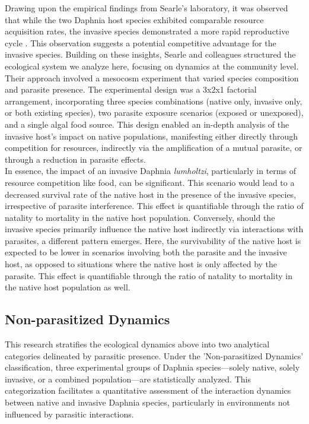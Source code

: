 \documentclass[12pt]{article}
\begin{document}
Drawing upon the empirical findings from Searle's laboratory, it was observed that while the two Daphnia host species exhibited comparable resource acquisition rates, the invasive species demonstrated a more rapid reproductive cycle \cite{Searle2016}. This observation suggests a potential competitive advantage for the invasive species. Building on these insights, Searle and colleagues structured the ecological system we analyze here, focusing on dynamics at the community level. Their approach involved a mesocosm experiment that varied species composition and parasite presence. The experimental design was a 3x2x1 factorial arrangement, incorporating three species combinations (native only, invasive only, or both existing species), two parasite exposure scenarios (exposed or unexposed), and a single algal food source. This design enabled an in-depth analysis of the invasive host's impact on native populations, manifesting either directly through competition for resources, indirectly via the amplification of a mutual parasite, or through a reduction in parasite effects.\\

In essence, the impact of an invasive Daphnia \textit{lumholtzi}, particularly in terms of resource competition like food, can be significant. This scenario would lead to a decreased survival rate of the native host in the presence of the invasive species, irrespective of parasite interference. This effect is quantifiable through the ratio of natality to mortality in the native host population. Conversely, should the invasive species primarily influence the native host indirectly via interactions with parasites, a different pattern emerges. Here, the survivability of the native host is expected to be lower in scenarios involving both the parasite and the invasive host, as opposed to situations where the native host is only affected by the parasite. This effect is quantifiable through the ratio of natality to mortality in the native host population as well.\\

\subsection{Non-parasitized Dynamics}
This research stratifies the ecological dynamics above into two analytical categories delineated by parasitic presence. Under the 'Non-parasitized Dynamics' classification, three experimental groups of Daphnia species—solely native, solely invasive, or a combined population—are statistically analyzed. This categorization facilitates a quantitative assessment of the interaction dynamics between native and invasive Daphnia species, particularly in environments not influenced by parasitic interactions.\\
\end{document}
